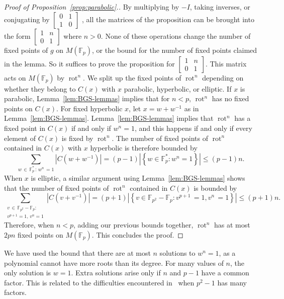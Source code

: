 \documentclass[10pt]{amsart}
\theoremstyle{definition}\newtheorem{defi}[theo]{Definition}\newtheorem{rema}[theo]{Remark}\newtheorem{exam}[theo]{Example}\newtheorem{exem}[theo]{Example}\newtheorem{nota}[theo]{Notation}
\newcommand{\F}{\mathbb{F}}
\DeclareMathOperator{\rot}{rot}
\begin{document}
\begin{proof}[{Proof of Proposition~\ref{prop:parabolic}.}]
By multiplying by $-I$, taking inverses, or conjugating by 
$\left[
\begin{smallmatrix}
0 & 1 \\
1 & 0
\end{smallmatrix}\right]$
, all the matrices of the proposition can be brought into the form $
\left[
\begin{smallmatrix}
1 & n\\
0 & 1
\end{smallmatrix}\right]$ where $n>0$. None of these operations change the number of fixed points of $g$ on $M(\F_{p})$, or the bound for the number of fixed points claimed in the lemma. So it suffices to prove the proposition for $\left[
\begin{smallmatrix}
1 & n\\
0 & 1
\end{smallmatrix}\right]$. This matrix acts on $M(\F_{p})$ by $\rot^{n}$. We split up the fixed points of $\rot^{n}$ depending on whether they belong to $C(x)$ with $x$ parabolic, hyperbolic, or elliptic. If $x$ is parabolic, Lemma~\ref{lem:BGS-lemmas} implies that for $n<p$, $\rot^{n}$ has no fixed points on $C(x)$. For fixed hyperbolic $x$, let $x=w+w^{-1}$ as in Lemma~\ref{lem:BGS-lemmas}. Lemma~\ref{lem:BGS-lemmas} implies that $\rot^{n}$ has a fixed point in $C(x)$ if and only if $w^{n}=1$, and this happens if and only if every element of $C(x)$ is fixed by $\rot^{n}$. The number of fixed points of $\rot^{n}$ contained in $C(x)$ with $x$ hyperbolic is therefore bounded by
\[
\sum_{w\,\in\,\F_{p}^{*}\,:\,w^{n}\,=1}\left|C\left(w+w^{-1}\right)\right|=(p-1)|\left\{w\in\F_{p}^{*}:w^{n}=1\right\}|\leq(p-1)n.
\]
When $x$ is elliptic, a similar argument using Lemma~\ref{lem:BGS-lemmas} shows that the number of fixed points of $\rot^{n}$ contained in $C(x)$ is bounded by
\[
\sum_{ \substack{v\,\in\,\F_{p^{2}}-\F_{p} : \\ v^{p+1}=1,\,v^{n}=1 } }\left|C\left(v+v^{-1}\right)\right|=(p+1)|\left\{v\in\F_{p^{2}}-\F_{p}:v^{p+1}\,=1,v^{n}\,=1\right\}| \leq(p+1)n.
\]
Therefore, when $n<p$, adding our previous bounds together, $\rot^{n}$ has at most $2pn$ fixed points on $M(\F_{p})$. This concludes the proof.
\end{proof}

We have used the bound that there are at most $n$ solutions to $w^n = 1$, as a polynomial cannot have more roots than its degree. For many values of $n$, the only solution is $w=1$. Extra solutions arise only if $n$ and $p-1$ have a common factor. This is related to the difficulties encountered in~\cite{BGS} when $p^2-1$ has many factors.
\end{document}

